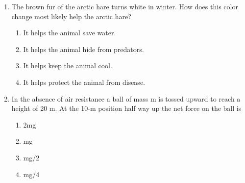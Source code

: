 \documentclass[12pt]{article}
\begin{document}
\begin{enumerate}[label=\arabic*.]
\begin{enumerate}[label=(\alph*)]
\end{enumerate}
\item The brown fur of the arctic hare turns white in winter. How does this color change most likely help the arctic hare?
\begin{enumerate}[label=(\alph*)]
    \item It helps the animal save water.
    \item It helps the animal hide from predators.
    \item It helps keep the animal cool.
    \item It helps protect the animal from disease.
\end{enumerate}
\item In the absence of air resistance a ball of mass m is tossed upward to reach a height of 20 m. At the 10-m position half way up the net force on the ball is
\begin{enumerate}[label=(\alph*)]
    \item 2mg
    \item mg
    \item mg/2
    \item mg/4
\end{enumerate}
\end{enumerate}
\end{document}
